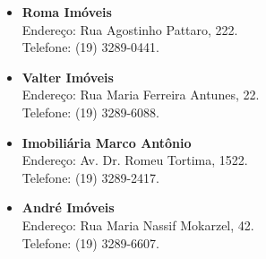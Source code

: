 \begin{itemize}
\item   \textbf{Roma Imóveis}
        \\Endereço: Rua Agostinho Pattaro, 222.
        \\Telefone: (19) 3289-0441.

\item   \textbf{Valter Imóveis}
        \\Endereço: Rua Maria Ferreira Antunes, 22.
        \\Telefone: (19) 3289-6088.

\item   \textbf{Imobiliária Marco Antônio}
        \\Endereço: Av. Dr. Romeu Tortima, 1522.
        \\Telefone: (19) 3289-2417.

\item   \textbf{André Imóveis}
        \\Endereço: Rua Maria Nassif Mokarzel, 42.
        \\Telefone: (19) 3289-6607.

\end{itemize}
